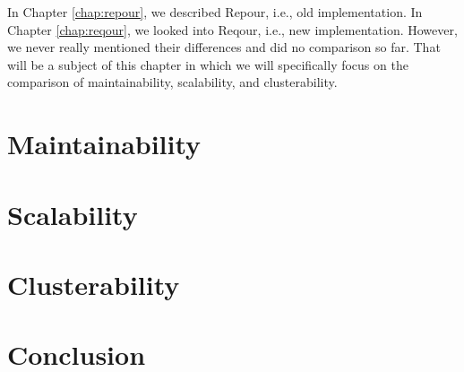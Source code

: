 \documentclass[../main.tex]{subfiles}
\begin{document}
In Chapter \ref{chap:repour}, we described Repour, i.e., old implementation. In Chapter \ref{chap:reqour}, we looked into Reqour, i.e., new implementation. However, we never really mentioned their differences and did no comparison so far. That will be a subject of this chapter in which we will specifically focus on the comparison of maintainability, scalability, and clusterability.

\section{Maintainability}


\section{Scalability}


\section{Clusterability}


\section*{Conclusion}

\end{document}
